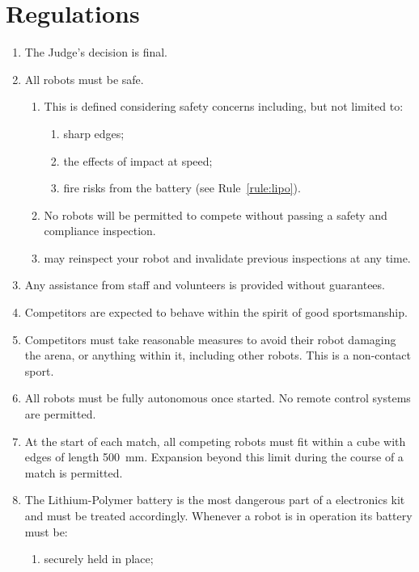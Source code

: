 \section{Regulations}
\label{sec:regs}

\begin{enumerate}
\item The Judge's decision is final.
\item All robots must be safe.
  \begin{enumerate}
    \item This is defined considering safety concerns including, but not limited
          to:
      \begin{enumerate}
        \item sharp edges;
        \item the effects of impact at speed;
        \item fire risks from the battery (see Rule~\ref{rule:lipo}).
      \end{enumerate}
    \item No robots will be permitted to compete without passing a safety and
          compliance inspection.
    \item \org may reinspect your robot and invalidate previous inspections at
          any time.
  \end{enumerate}
\item Any assistance from \org staff and volunteers is provided without
      guarantees.
\item Competitors are expected to behave within the spirit of good
      sportsmanship.
\item Competitors must take reasonable measures to avoid their robot damaging
      the arena, or anything within it, including other robots. This is a
      non-contact sport.
\item All robots must be fully autonomous once started. No remote control
      systems are permitted.
\item At the start of each match, all competing robots must fit within a cube
      with edges of length \SI{500}{mm}. Expansion beyond this limit during the
      course of a match is permitted.
\item \label{rule:lipo}
      The Lithium-Polymer battery is the most dangerous part of a \org
      electronics kit and must be treated accordingly. Whenever a robot is in
      operation its battery must be:
  \begin{enumerate}
    \item securely held in place;

\end{enumerate}
\end{enumerate}
